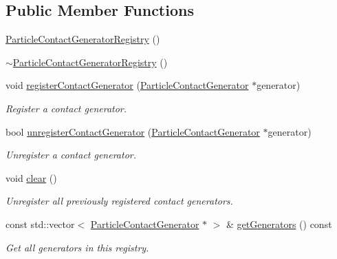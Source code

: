 \subsection*{Public Member Functions}
\begin{DoxyCompactItemize}
\item 
\mbox{\hyperlink{classr3_1_1_particle_contact_generator_registry_a2c26127b369a7da81d5d29e4734633e6}{Particle\+Contact\+Generator\+Registry}} ()
\item 
\mbox{\hyperlink{classr3_1_1_particle_contact_generator_registry_a26a9ed03c6e050ffa99669bd0928d520}{$\sim$\+Particle\+Contact\+Generator\+Registry}} ()
\item 
void \mbox{\hyperlink{classr3_1_1_particle_contact_generator_registry_a34d44783a363a513217dec694f625687}{register\+Contact\+Generator}} (\mbox{\hyperlink{classr3_1_1_particle_contact_generator}{Particle\+Contact\+Generator}} $\ast$generator)
\begin{DoxyCompactList}\small\item\em Register a contact generator. \end{DoxyCompactList}\item 
bool \mbox{\hyperlink{classr3_1_1_particle_contact_generator_registry_ae8de6dd84335777644f7eac93b82ba1e}{unregister\+Contact\+Generator}} (\mbox{\hyperlink{classr3_1_1_particle_contact_generator}{Particle\+Contact\+Generator}} $\ast$generator)
\begin{DoxyCompactList}\small\item\em Unregister a contact generator. \end{DoxyCompactList}\item 
void \mbox{\hyperlink{classr3_1_1_particle_contact_generator_registry_a8c24a369a980542a769875466eb835d0}{clear}} ()
\begin{DoxyCompactList}\small\item\em Unregister all previously registered contact generators. \end{DoxyCompactList}\item 
const std\+::vector$<$ \mbox{\hyperlink{classr3_1_1_particle_contact_generator}{Particle\+Contact\+Generator}} $\ast$ $>$ \& \mbox{\hyperlink{classr3_1_1_particle_contact_generator_registry_a31b80b662b52afd910ba3d4d07fd8649}{get\+Generators}} () const
\begin{DoxyCompactList}\small\item\em Get all generators in this registry. \end{DoxyCompactList}\end{DoxyCompactItemize}
